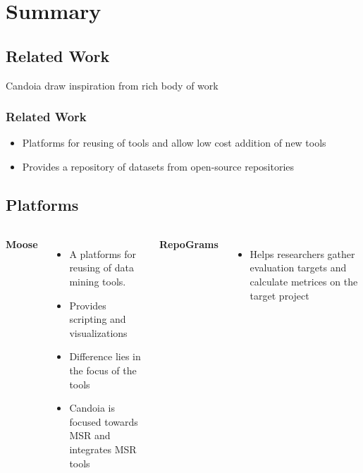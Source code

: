 \section*{Summary}
\subsection{Related Work}
    \begin{frame}
        Candoia draw inspiration from rich body of work
        \frametitle{Related Work}
         \begin{itemize}
            \item Platforms for reusing of tools and allow low cost addition of new tools
             \item Provides a repository of datasets from open-source repositories
         \end{itemize}
    \end{frame}

    \subsection{Platforms}
        \begin{frame}
            \begin{columns}
                    \textbf{Moose}
                    \begin{itemize}
                      \item A platforms for reusing of data mining tools.
                      \item Provides scripting and visualizations
                      \item Difference lies in the focus of the tools
                      \item Candoia is focused towards MSR and integrates MSR tools
                    \end{itemize}

                \textbf{RepoGrams}
                    \begin{itemize}
                      \item Helps researchers gather evaluation targets and calculate metrices on the target project
                    \end{itemize}
            \end{columns}
        \end{frame}

